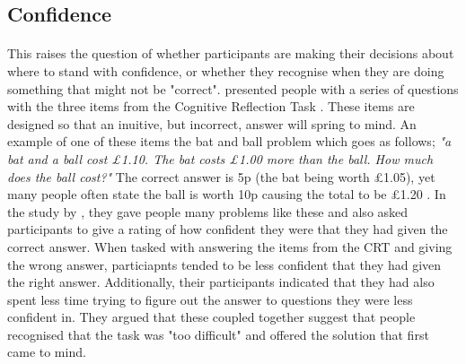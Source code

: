 \documentclass[12pt]{article}
\begin{document}
\subsection*{Confidence}
\paragraph{} This raises the question of whether participants are making their decisions about where to stand with confidence, or whether they recognise when they are doing something that might not be "correct". \cite{SZOLLOSI20171} presented people with a series of questions with the three items from the Cognitive Reflection Task \citep[CRT: ][]{Frederick2005CRT}. These items are designed so that an inuitive, but incorrect, answer will spring to mind. An example of one of these items the bat and ball problem which goes as follows; \textit{"a bat and a ball cost \pounds1.10. The bat costs \pounds1.00 more than the ball. How much does the ball cost?"} The correct answer is 5p (the bat being worth \pounds1.05), yet many people often state the ball is worth 10p causing the total to be \pounds1.20 \citep{Frederick2005CRT}. In the study by \cite{SZOLLOSI20171}, they gave people many problems like these and also asked participants to give a rating of how confident they were that they had given the correct answer. When tasked with answering the items from the CRT and giving the wrong answer, particiapnts tended to be less confident that they had given the right answer. Additionally, their participants indicated that they had also spent less time trying to figure out the answer to questions they were less confident in. They argued that these coupled together suggest that people recognised that the task was "too difficult" and offered the solution that first came to mind. 
\end{document}
